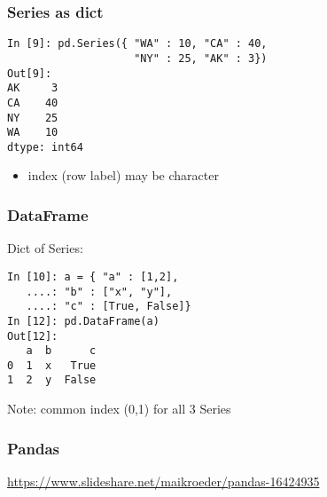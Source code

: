 \documentclass[mathserif, xcolor=table, svgnames]{beamer}
\begin{document}
\begin{frame}[fragile]
  \frametitle{Series as dict}
\begin{lstlisting}
In [9]: pd.Series({ "WA" : 10, "CA" : 40, 
                    "NY" : 25, "AK" : 3})
Out[9]: 
AK     3
CA    40
NY    25
WA    10
dtype: int64
\end{lstlisting}
  \begin{itemize}
  \item index (row label) may be character
  \end{itemize}
\end{frame}


\begin{frame}[fragile]
  \frametitle{DataFrame}
  Dict of Series:
\begin{lstlisting}
In [10]: a = { "a" : [1,2],
   ....: "b" : ["x", "y"],
   ....: "c" : [True, False]}
In [12]: pd.DataFrame(a)
Out[12]: 
   a  b      c
0  1  x   True
1  2  y  False
\end{lstlisting}
  Note: common index (0,1) for all 3 Series
\end{frame}

\begin{frame}
  \frametitle{Pandas}
  \url{https://www.slideshare.net/maikroeder/pandas-16424935}
\end{frame}
\end{document}
